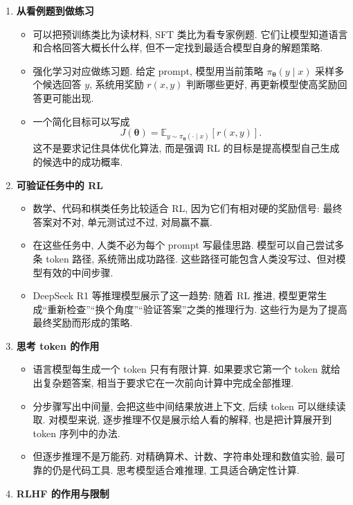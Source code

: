 \documentclass{../nndlcourse}
\begin{document}
\begin{enumerate}
  \item \textbf{从看例题到做练习}
    \begin{itemize}
      \item 可以把预训练类比为读材料, SFT 类比为看专家例题. 它们让模型知道语言和合格回答大概长什么样, 但不一定找到最适合模型自身的解题策略.
      \item 强化学习对应做练习题. 给定 prompt, 模型用当前策略 $\pi_{\boldsymbol{\theta}}(y\mid x)$ 采样多个候选回答 $y$, 系统用奖励 $r(x,y)$ 判断哪些更好, 再更新模型使高奖励回答更可能出现.
      \item 一个简化目标可以写成
      \[
        J(\boldsymbol{\theta})
        =
        \mathbb{E}_{y\sim \pi_{\boldsymbol{\theta}}(\cdot\mid x)}
        [r(x,y)].
      \]
      这不是要求记住具体优化算法, 而是强调 RL 的目标是提高模型自己生成的候选中的成功概率.
    \end{itemize}
  \item \textbf{可验证任务中的 RL}
    \begin{itemize}
      \item 数学、代码和棋类任务比较适合 RL, 因为它们有相对硬的奖励信号: 最终答案对不对, 单元测试过不过, 对局赢不赢.
      \item 在这些任务中, 人类不必为每个 prompt 写最佳思路. 模型可以自己尝试多条 token 路径, 系统筛出成功路径. 这些路径可能包含人类没写过、但对模型有效的中间步骤.
      \item DeepSeek R1 等推理模型展示了这一趋势: 随着 RL 推进, 模型更常生成“重新检查”“换个角度”“验证答案”之类的推理行为. 这些行为是为了提高最终奖励而形成的策略.
    \end{itemize}
  \item \textbf{思考 token 的作用}
    \begin{itemize}
      \item 语言模型每生成一个 token 只有有限计算. 如果要求它第一个 token 就给出复杂题答案, 相当于要求它在一次前向计算中完成全部推理.
      \item 分步骤写出中间量, 会把这些中间结果放进上下文, 后续 token 可以继续读取. 对模型来说, 逐步推理不仅是展示给人看的解释, 也是把计算展开到 token 序列中的办法.
      \item 但逐步推理不是万能药. 对精确算术、计数、字符串处理和数值实验, 最可靠的仍是代码工具. 思考模型适合难推理, 工具适合确定性计算.
    \end{itemize}
  \item \textbf{RLHF 的作用与限制}
    \begin{itemize}

\end{itemize}
\end{enumerate}
\end{document}
